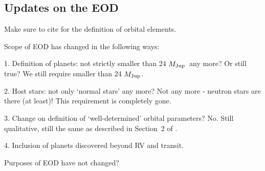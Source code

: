 \documentclass[11pt,preprint]{aastex}
\def\mjup{$M_{\rm Jup}$}
\begin{document}
\begin{CJK*}{UTF8}{gbsn}
\begin{comment}
As the number of exoplanet discoveries keeps rising, it is important
to keep track of these discoveries and cataloging the orbital
parameters and host star properties of exoplanet systems. There are
several entities that are devoted to this effort, including the
Exoplanet Orbit Database (EOD) and Exoplanets Data Explorer\footnote{See
  \url{http://exoplanets.org}.} \citep{Wright2011}, the Extrasolar
Planets Encyclopaedia\footnote{See \url{http://exoplanet.eu}.}
\citep{Schneider2011}, the NASA Exoplanet Archive\footnote{See
  \url{http://exoplanetarchive.ipac.caltech.edu}.}
\citep{Akeson2013}, and so on.

This paper describes the continuing efforts since \cite{Wright2011} to
maintain the EOD and the Exoplanets Data Explorer at exoplanets.org.

The efforts of keeping track of exoplanet discoveries are being
carried out by several entities, and most notably, the Extrasolar
Planets Encyclopaedia\footnote{See \url{http://exoplanet.eu}.}
\citep{Schneider2011}, the NASA Exoplanet Archive\footnote{See
  \url{http://exoplanetarchive.ipac.caltech.edu}.}
\citep{Akeson2013}, and the Exoplanet Orbit Database (EOD) and
Exoplanets Data Explorer\footnote{See \url{http://exoplanets.org}.}
\citep{Wright2011}.
\end{comment}


\section{Updates on the EOD}\label{sec:update}
Make sure to cite \cite{Wright2013} for the definition of orbital elements. 

Scope of EOD has changed in the following ways:

1. Definition of planets: not strictly smaller than 24 \mjup\ any
more? Or still true? We still require smaller than 24 \mjup.

2. Host stars: not only `normal stars' any more? Not any more -
neutron stars are there (at least)! This requirement is completely gone.

3. Change on definition of `well-determined' orbital parameters? No. Still
qualitative, still the same as described in Section~2 of \cite{Wright2011}.

4. Inclusion of planets discovered beyond RV and transit.

Purposes of EOD have not changed?


\end{CJK*}
\end{document}
